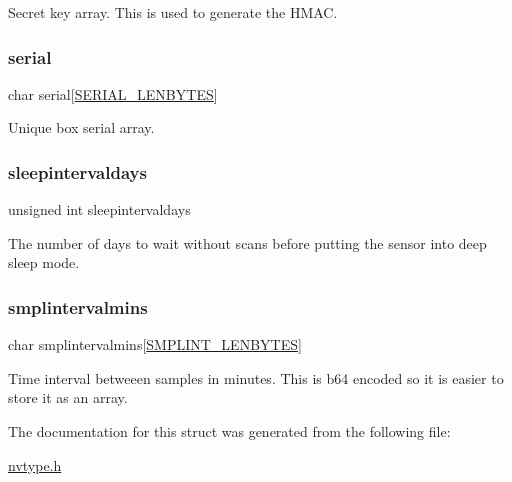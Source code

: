 Secret key array. This is used to generate the H\+M\+AC. \mbox{\label{structnvstruct_a8c4928cc85c5336514401eb142ea7d50}} 
\subsubsection{\texorpdfstring{serial}{serial}}
{\footnotesize\ttfamily char serial\mbox{[}\mbox{\hyperlink{nvtype_8h_a09589b0f4cf4e32679b6dc064903edef}{S\+E\+R\+I\+A\+L\+\_\+\+L\+E\+N\+B\+Y\+T\+ES}}\mbox{]}}

Unique box serial array. \mbox{\label{structnvstruct_a7535c524cca52dcf1e60b1e6762fea4c}} 
\subsubsection{\texorpdfstring{sleepintervaldays}{sleepintervaldays}}
{\footnotesize\ttfamily unsigned int sleepintervaldays}

The number of days to wait without scans before putting the sensor into deep sleep mode. \mbox{\label{structnvstruct_a34de27bbd20aa5f15e4e4482ce5a0309}} 
\subsubsection{\texorpdfstring{smplintervalmins}{smplintervalmins}}
{\footnotesize\ttfamily char smplintervalmins\mbox{[}\mbox{\hyperlink{nvtype_8h_a44d3fb460b6c9383a2b3248544aa13d0}{S\+M\+P\+L\+I\+N\+T\+\_\+\+L\+E\+N\+B\+Y\+T\+ES}}\mbox{]}}

Time interval betweeen samples in minutes. This is b64 encoded so it is easier to store it as an array. 

The documentation for this struct was generated from the following file\+:\begin{DoxyCompactItemize}
\item 
\mbox{\hyperlink{nvtype_8h}{nvtype.\+h}}\end{DoxyCompactItemize}
